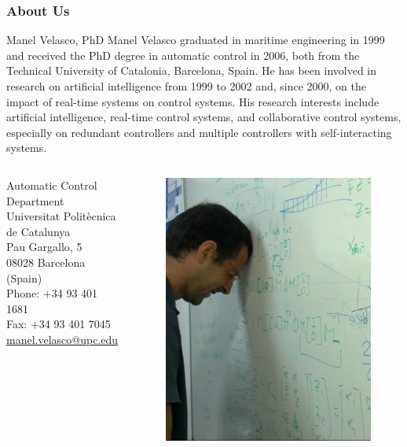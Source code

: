 \documentclass[colorlinks,10pt]{beamer}
\begin{document}
\begin{frame}[plain]\frametitle{About Us}
\begin{block}{Manel Velasco, PhD}
    \small Manel Velasco graduated in maritime engineering in 1999 and received the PhD degree in automatic control in 2006, both from the Technical University of Catalonia, Barcelona, Spain.  He has been involved in research on artificial intelligence from 1999 to 2002 and, since 2000, on the impact of real-time systems on control systems. His research interests include artificial intelligence, real-time control systems, and collaborative control systems, especially on redundant controllers and multiple controllers with self-interacting systems.
\end{block}

    \begin{columns}[c]

Automatic Control Department\\
Universitat Politècnica de Catalunya\\
Pau Gargallo, 5\\
08028 Barcelona (Spain)\\
Phone: +34 93 401 1681\\
Fax: +34 93 401 7045\\
\href{manel.velasco@upc.edu}{manel.velasco@upc.edu}
\begin{figure}[!htb]
    \centering
    \includegraphics[width=\textwidth]{figs/manel}
\end{figure}
\end{columns}
\end{frame}
\end{document}
